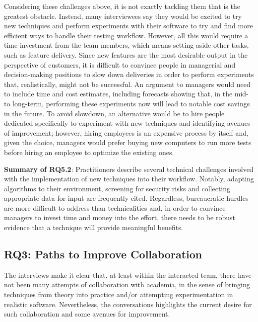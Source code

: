Considering these challenges above, it is not exactly tackling them that is the greatest obstacle.
Instead, many interviewees say they would be excited to try new techniques and perform experiments with their software to try and find more efficient ways to handle their testing workflow.
However, all this would require a time investment from the team members, which means setting aside other tasks, such as feature delivery.
Since new features are the most desirable output in the perspective of customers, it is difficult to convince people in managerial and decision-making positions to slow down deliveries in order to perform experiments that, realistically, might not be successful.
An argument to managers would need to include time and cost estimates, including forecasts showing that, in the mid- to long-term, performing these experiments now will lead to notable cost savings in the future.
To avoid slowdown, an alternative would be to hire people dedicated specifically to experiment with new techniques and identifying avenues of improvement; however, hiring employees is an expensive process by itself and, given the choice, managers would prefer buying new computers to run more tests before hiring an employee to optimize the existing ones.

\begin{tcolorbox}%
\textbf{Summary of RQ5.2}: 
Practitioners describe several technical challenges involved with the implementation of new techniques into their workflow.
Notably, adapting algorithms to their environment, screening for security risks and collecting appropriate data for input are frequently cited.
Regardless, bureaucratic hurdles are more difficult to address than technicalities and, in order to convince managers to invest time and money into the effort, there needs to be robust evidence that a technique will provide meaningful benefits.
\end{tcolorbox}


\subsection{RQ3: Paths to Improve Collaboration}

The interviews make it clear that, at least within the interacted team, there have not been many attempts of collaboration with academia, in the sense of bringing techniques from theory into practice and/or attempting experimentation in realistic software.
Nevertheless, the conversations highlights the current desire for such collaboration and some avenues for improvement.

